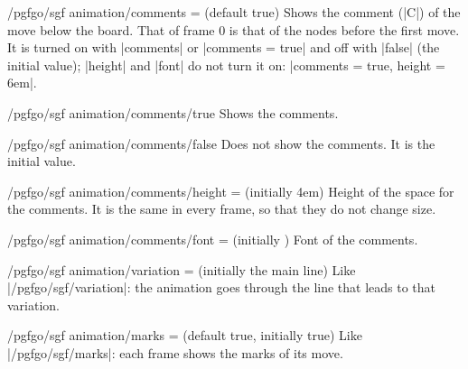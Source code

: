 \begin{key}{/pgfgo/sgf animation/comments =  (default true)}
	Shows the comment (|C|) of the move below the board. That of frame 0 is that of the nodes before the first move. It is turned on with |comments| or |comments = true| and off with |false| (the initial value); |height| and |font| do not turn it on: |comments = {true, height = 6em}|.
\end{key}

\begin{stylekey}{/pgfgo/sgf animation/comments/true}
	Shows the comments.
\end{stylekey}

\begin{stylekey}{/pgfgo/sgf animation/comments/false}
	Does not show the comments. It is the initial value.
\end{stylekey}

\begin{key}{/pgfgo/sgf animation/comments/height =  (initially 4em)}
	Height of the space for the comments. It is the same in every frame, so that they do not change size.
\end{key}

\begin{key}{/pgfgo/sgf animation/comments/font =  (initially \texttt{\string\small})}
	Font of the comments.

	\begin{codeexample}[width=5cm]
	\end{codeexample}
\end{key}

\begin{key}{/pgfgo/sgf animation/variation =  (initially the main line)}
	Like |/pgfgo/sgf/variation|: the animation goes through the line that leads to that variation.

	\begin{codeexample}[width=5cm]
	\end{codeexample}
\end{key}

\begin{key}{/pgfgo/sgf animation/marks =  (default true, initially true)}
	Like |/pgfgo/sgf/marks|: each frame shows the marks of its move.
\end{key}

